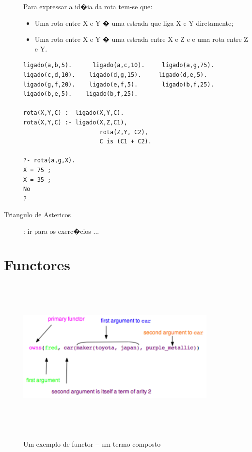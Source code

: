 \documentclass[final,a4paper]{article}
\begin{document}
\begin{description}
Para expressar a id�ia da rota tem-se que: 

\begin{itemize}
	\item Uma rota entre X e Y � uma estrada que liga X e Y diretamente;
	\item Uma rota entre X e Y � uma estrada entre X e Z e e uma rota entre Z e Y.
\end{itemize}

{\small
\begin{verbatim}
ligado(a,b,5).      ligado(a,c,10).     ligado(a,g,75).
ligado(c,d,10).    ligado(d,g,15).     ligado(d,e,5).
ligado(g,f,20).    ligado(e,f,5).       ligado(b,f,25).
ligado(b,e,5).    ligado(b,f,25).

rota(X,Y,C) :- ligado(X,Y,C).
rota(X,Y,C) :- ligado(X,Z,C1),
                      rota(Z,Y, C2),
                      C is (C1 + C2).

?- rota(a,g,X).
X = 75 ;
X = 35 ;
No
?-
\end{verbatim}
}

\newpage
\item [Triangulo de Astericos]: ir para os exerc�cios ...

\end{description}


\section{Functores}


\begin{figure}[!htb]
\centering
\includegraphics[height=8cm, width=10cm]{figuras/functor_termo.pdf}
\label{fig_functor_termo}
\caption{Um exemplo de functor -- um termo composto}
\end{figure}
\end{document}
